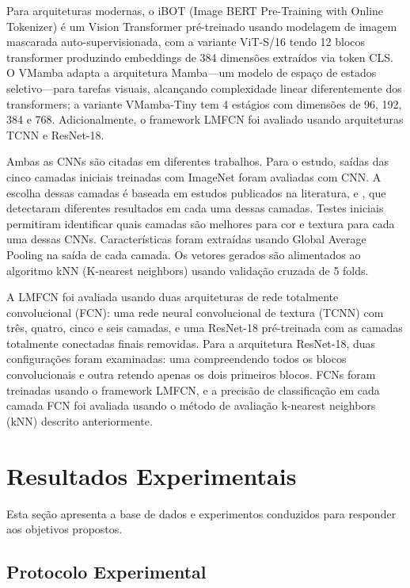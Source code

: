 \documentclass[conference]{IEEEtran}
\begin{document}
Para arquiteturas modernas, o iBOT (Image BERT Pre-Training with Online Tokenizer) \'{e} um Vision Transformer pr\'{e}-treinado usando modelagem de imagem mascarada auto-supervisionada, com a variante ViT-S/16 tendo 12 blocos transformer produzindo embeddings de 384 dimens\~{o}es extra\'{i}dos via token CLS. O VMamba adapta a arquitetura Mamba---um modelo de espa\c{c}o de estados seletivo---para tarefas visuais, alcan\c{c}ando complexidade linear diferentemente dos transformers; a variante VMamba-Tiny tem 4 est\'{a}gios com dimens\~{o}es de 96, 192, 384 e 768. Adicionalmente, o framework LMFCN foi avaliado usando arquiteturas TCNN e ResNet-18.

Ambas as CNNs s\~{a}o citadas em diferentes trabalhos. Para o estudo, sa\'{i}das das cinco camadas iniciais treinadas com ImageNet foram avaliadas com CNN. A escolha dessas camadas \'{e} baseada em estudos publicados na literatura, \cite{b2} e \cite{b8}, que detectaram diferentes resultados em cada uma dessas camadas. Testes iniciais permitiram identificar quais camadas s\~{a}o melhores para cor e textura para cada uma dessas CNNs. Caracter\'{i}sticas foram extra\'{i}das usando Global Average Pooling na sa\'{i}da de cada camada. Os vetores gerados s\~{a}o alimentados ao algoritmo kNN (K-nearest neighbors) usando valida\c{c}\~{a}o cruzada de 5 folds.

A LMFCN foi avaliada usando duas arquiteturas de rede totalmente convolucional (FCN): uma rede neural convolucional de textura (TCNN) com tr\^{e}s, quatro, cinco e seis camadas, e uma ResNet-18 pr\'{e}-treinada com as camadas totalmente conectadas finais removidas. Para a arquitetura ResNet-18, duas configura\c{c}\~{o}es foram examinadas: uma compreendendo todos os blocos convolucionais e outra retendo apenas os dois primeiros blocos. FCNs foram treinadas usando o framework LMFCN, e a precis\~{a}o de classifica\c{c}\~{a}o em cada camada FCN foi avaliada usando o m\'{e}todo de avalia\c{c}\~{a}o k-nearest neighbors (kNN) descrito anteriormente.


\section{Resultados Experimentais}

Esta se\c{c}\~{a}o apresenta a base de dados e experimentos conduzidos para responder aos objetivos propostos.

\subsection{Protocolo Experimental}
\end{document}
